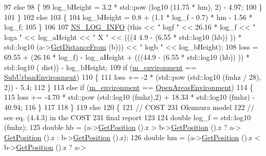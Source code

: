 \begin{DoxyCode}
97           \textcolor{keywordflow}{else}
98             \{
99               log\_bHeight = 3.2 * std::pow (log10 (11.75 * hm), 2) - 4.97;
100             \}
101         \}
102       \textcolor{keywordflow}{else}
103         \{
104           log\_bHeight = 0.8 + (1.1 * log\_f - 0.7) * hm - 1.56 * log\_f;
105         \}
106 
107       \hyperlink{group__logging_gafbd73ee2cf9f26b319f49086d8e860fb}{NS\_LOG\_INFO} (\textcolor{keyword}{this} << \textcolor{stringliteral}{" logf "} << 26.16 * log\_f << \textcolor{stringliteral}{" loga "} << log\_aHeight << \textcolor{stringliteral}{" X "} << (((4
      4.9 - (6.55 * std::log10 (hb)) )) * std::log10 (a->\hyperlink{classns3_1_1MobilityModel_afa16c20b3c5fd135be075000f0272f31}{GetDistanceFrom} (b))) << \textcolor{stringliteral}{" logb "} << 
      log\_bHeight);
108       loss = 69.55 + (26.16 * log\_f) - log\_aHeight + (((44.9 - (6.55 * std::log10 (hb)) )) * std::log10 (
      dist)) - log\_bHeight;
109       \textcolor{keywordflow}{if} (\hyperlink{classns3_1_1OkumuraHataPropagationLossModel_a2b91de7c6c22099b42d6822e47116928}{m\_environment} == \hyperlink{group__propagation_gga0e392ed771a28c92112047e63308a53aa06cbfe108cde1eb2070702b2ed4fb189}{SubUrbanEnvironment})
110         \{
111           loss += -2 * (std::pow (std::log10 (fmhz / 28), 2)) - 5.4;
112         \}
113       \textcolor{keywordflow}{else} \textcolor{keywordflow}{if} (\hyperlink{classns3_1_1OkumuraHataPropagationLossModel_a2b91de7c6c22099b42d6822e47116928}{m\_environment} == \hyperlink{group__propagation_gga0e392ed771a28c92112047e63308a53aa51f78effebc3753d7cd2ee9b5924c028}{OpenAreasEnvironment})
114         \{
115           loss += -4.70 * std::pow (std::log10 (fmhz),2) + 18.33 * std::log10 (fmhz) - 40.94;
116         \}
117 
118     \}
119   \textcolor{keywordflow}{else}
120     \{
121       \textcolor{comment}{// COST 231 Okumura model}
122       \textcolor{comment}{// see eq. (4.4.3) in the COST 231 final report}
123 
124       \textcolor{keywordtype}{double} log\_f = std::log10 (fmhz);
125       \textcolor{keywordtype}{double} hb = (a->\hyperlink{classns3_1_1MobilityModel_aba838f06ec5bbb2d193d94b8c0e4abb4}{GetPosition} ().z > b->\hyperlink{classns3_1_1MobilityModel_aba838f06ec5bbb2d193d94b8c0e4abb4}{GetPosition} ().z ? a->
      \hyperlink{classns3_1_1MobilityModel_aba838f06ec5bbb2d193d94b8c0e4abb4}{GetPosition} ().z : b->\hyperlink{classns3_1_1MobilityModel_aba838f06ec5bbb2d193d94b8c0e4abb4}{GetPosition} ().z);
126       \textcolor{keywordtype}{double} hm = (a->\hyperlink{classns3_1_1MobilityModel_aba838f06ec5bbb2d193d94b8c0e4abb4}{GetPosition} ().z < b->\hyperlink{classns3_1_1MobilityModel_aba838f06ec5bbb2d193d94b8c0e4abb4}{GetPosition} ().z ? a->

\end{DoxyCode}
